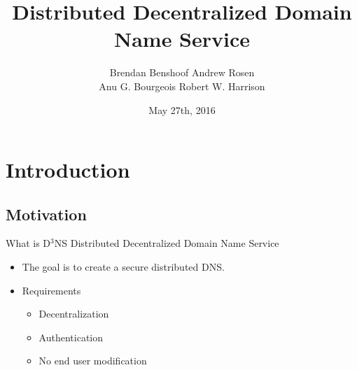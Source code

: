 \documentclass[11pt]{beamer}
\title[D$^3$NS]{Distributed Decentralized Domain Name Service}
\author{
Brendan Benshoof \qquad Andrew Rosen \\ \qquad Anu G. Bourgeois \qquad Robert W. Harrison }
\institute{Georgia State University}
\date{May 27th, 2016}
\begin{document}
	
\maketitle

\section{Introduction}
\subsection{Motivation}

\begin{frame}{What is D$^3$NS}
Distributed Decentralized Domain Name Service

\begin{itemize}
	\item The goal is to create a secure distributed DNS. 
	\item Requirements 
	\begin{itemize}
		\item Decentralization
		\item Authentication
		\item No end user modification
	\end{itemize}
\end{itemize}

\end{frame}


\end{document}
